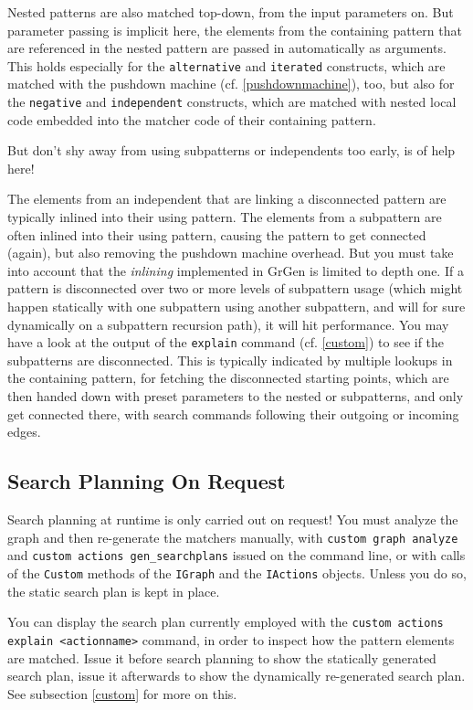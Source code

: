 Nested patterns are also matched top-down, from the input parameters on. 
But parameter passing is implicit here, the elements from the containing pattern that are referenced in the nested pattern are passed in automatically as arguments.
This holds especially for the \texttt{alternative} and \texttt{iterated} constructs, which are matched with the pushdown machine (cf. \ref{pushdownmachine}), too, but also for the \texttt{negative} and \texttt{independent} constructs, which are matched with nested local code embedded into the matcher code of their containing pattern.

But don't shy away from using subpatterns or independents too early,  is of help here!

The elements from an independent that are linking a disconnected pattern are typically inlined into their using pattern.
The elements from a subpattern are often inlined into their using pattern, causing the pattern to get connected (again), 
but also removing the pushdown machine overhead.
But you must take into account that the \emph{inlining} implemented in GrGen is limited to depth one.
If a pattern is disconnected over two or more levels of subpattern usage (which might happen statically with one subpattern using another subpattern, and will for sure dynamically on a subpattern recursion path), it will hit performance.
You may have a look at the output of the \texttt{explain} command (cf. \ref{custom}) to see if the subpatterns are disconnected.
This is typically indicated by multiple lookups in the containing pattern, 
for fetching the disconnected starting points,
which are then handed down with preset parameters to the nested or subpatterns,
and only get connected there,
with search commands following their outgoing or incoming edges.

\subsection{Search Planning On Request}
Search planning at runtime is only carried out on request!
You must analyze the graph and then re-generate the matchers manually,
with \texttt{custom graph analyze} and \texttt{custom actions gen\_searchplans} issued on the command line, 
or with calls of the \texttt{Custom} methods of the \texttt{IGraph} and the \texttt{IActions} objects.
Unless you do so, the static search plan is kept in place.

You can display the search plan currently employed with the \texttt{custom actions explain <actionname>} command,
in order to inspect how the pattern elements are matched.
Issue it before search planning to show the statically generated search plan, issue it afterwards to show the dynamically re-generated search plan.
See subsection \ref{custom} for more on this.

